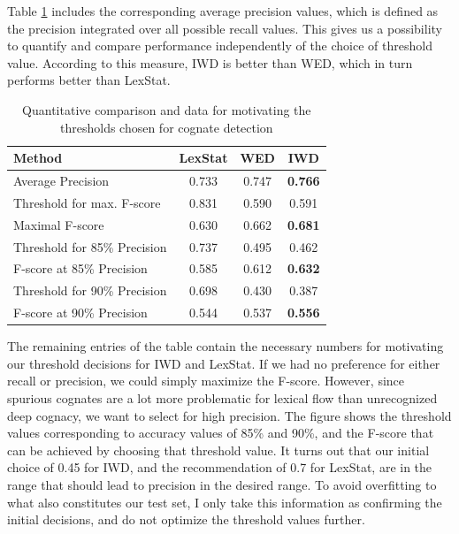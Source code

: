 Table \ref{average-precision-thresholds} includes the corresponding average precision values, which is defined as the precision integrated over all possible recall values. This gives us a possibility to quantify and compare performance independently of the choice of threshold value. According to this measure, IWD is better than WED, which in turn performs better than LexStat.

\begin{table}
 \centering
 \begin{tabular}{lccc}
  \hline \hline
  Method & LexStat & WED & IWD\\
  \hline
  Average Precision & 0.733 & 0.747 & \textbf{0.766}\\
  \hline
  Threshold for max. F-score & 0.831 & 0.590 & 0.591\\
  Maximal F-score & 0.630 & 0.662 & \textbf{0.681}\\
  \hline
  Threshold for 85\% Precision & 0.737 & 0.495 & 0.462\\
  F-score at 85\% Precision & 0.585 & 0.612 & \textbf{0.632}\\
  \hline
  Threshold for 90\% Precision & 0.698 & 0.430 & 0.387\\
  F-score at 90\% Precision & 0.544 & 0.537 & \textbf{0.556}\\
  \hline
 \end{tabular}
 \caption{Quantitative comparison and data for motivating the thresholds chosen for cognate detection}
 \label{average-precision-thresholds}
\end{table}

The remaining entries of the table contain the necessary numbers for motivating our threshold decisions for IWD and LexStat. If we had no preference for either recall or precision, we could simply maximize the F-score. However, since spurious cognates are a lot more problematic for lexical flow than unrecognized deep cognacy, we want to select for high precision. The figure shows the threshold values corresponding to accuracy values of 85\% and 90\%, and the F-score that can be achieved by choosing that threshold value. It turns out that our initial choice of 0.45 for IWD, and the recommendation of 0.7 for LexStat, are in the range that should lead to precision in the desired range. To avoid overfitting to what also constitutes our test set, I only take this information as confirming the initial decisions, and do not optimize the threshold values further.

